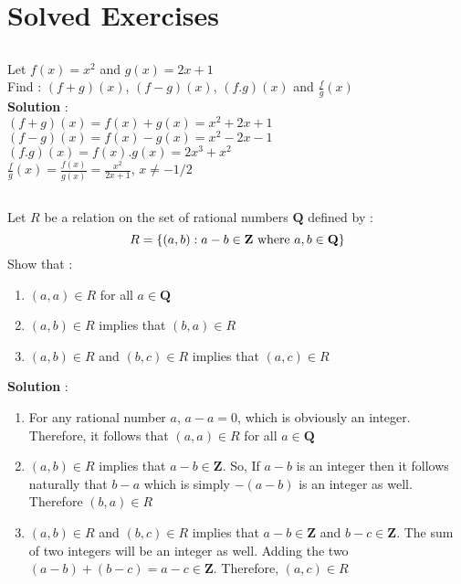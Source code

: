 \documentclass[12pt, letterpaper]{article}
\begin{document}
\section{Solved Exercises}
\subsection{}
Let $f(x) = x^2$ and $g(x) = 2x+1$ \\
Find : $(f+g)(x)$, $(f-g)(x)$, $(f.g)(x)$ and $\frac{f}{g}(x)$\\
\textbf{Solution} :\\
$(f+g) (x) = f(x) + g(x) = x^2 + 2x + 1$ \\
$(f-g) (x) = f(x) - g(x) = x^2 - 2x -1$ \\
$(f.g) (x) = f(x) . g(x) = 2x^3 + x^2$ \\
$\frac{f}{g}(x) = \frac{f(x)}{g(x)} = \frac{x^2}{2x+1}$, $x \neq -1/2$

\subsection{}
Let $R$ be a relation on the set of rational numbers $\mathbf{Q}$ defined by : 
\begin{displaymath}
R = \{(a,b) : a-b \in \mathbf{Z} \textnormal{ where }a,b \in \mathbf{Q}\}
\end{displaymath}
Show that : 
\begin{enumerate}
    \item $(a,a) \in R$ for all $a \in \mathbf{Q}$
    \item $(a,b) \in R$ implies that $(b,a) \in R$
    \item $(a,b) \in R$ and $(b,c) \in R$ implies that $(a,c) \in R$
\end{enumerate}
\textbf{Solution} : 
\begin{enumerate}
    \item For any rational number $a$, $a-a = 0$, which is obviously an integer. Therefore, it follows that $(a,a) \in R$ for all $a \in \mathbf{Q}$
    \item $(a,b) \in R$ implies that $a-b \in \mathbf{Z}$. So, If $a-b$ is an integer then it follows naturally that $b-a$ which is simply $-(a-b)$ is an integer as well. Therefore $(b,a) \in R$
    \item $(a,b) \in R$ and $(b,c) \in R$ implies that $a-b \in \mathbf{Z}$ and $b-c \in \mathbf{Z}$. The sum of two integers will be an integer as well. Adding the two $(a-b) + (b-c) = a-c \in \mathbf{Z}$. Therefore, $(a,c) \in R$  
\end{enumerate}
\end{document}
